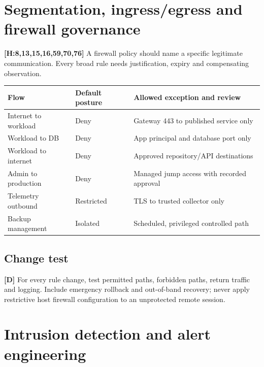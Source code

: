 \documentclass[10pt,letterpaper,oneside]{article}
\newcommand{\handbookref}[1]{\textsf{\color{accent}\textbf{[H:#1]}}}
\newcommand{\designed}{\textsf{\color{accent}\textbf{[D]}}}
\begin{document}
\section{Segmentation, ingress/egress and firewall governance}
\handbookref{8,13,15,16,59,70,76} A firewall policy should name a specific legitimate communication. Every broad rule needs justification, expiry and compensating observation.
\par\medskip\noindent\begin{tabularx}{\textwidth}{@{}p{}p{}X@{}}\toprule
Flow & Default posture & Allowed exception and review \\ \midrule
Internet to workload & Deny & Gateway 443 to published service only\\
Workload to DB & Deny & App principal and database port only\\
Workload to internet & Deny & Approved repository/API destinations\\
Admin to production & Deny & Managed jump access with recorded approval\\
Telemetry outbound & Restricted & TLS to trusted collector only\\
Backup management & Isolated & Scheduled, privileged controlled path\\
\bottomrule\end{tabularx}\par\medskip
\subsection{Change test}\designed{}
For every rule change, test permitted paths, forbidden paths, return traffic and logging. Include emergency rollback and out-of-band recovery; never apply restrictive host firewall configuration to an unprotected remote session.

\section{Intrusion detection and alert engineering}
\end{document}

